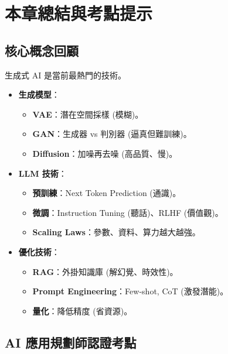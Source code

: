 \documentclass[
  letterpaper,
  DIV=11,
  numbers=noendperiod]{scrreprt}
\providecommand{\tightlist}{%
  \setlength{\itemsep}{0pt}\setlength{\parskip}{0pt}}
\begin{document}
\chapter{本章總結與考點提示}\label{sec-chapter8-summary}

\section{核心概念回顧}\label{ux6838ux5fc3ux6982ux5ff5ux56deux9867-7}

生成式 AI 是當前最熱門的技術。

\begin{itemize}
\tightlist
\item
  \textbf{生成模型}：

  \begin{itemize}
  \tightlist
  \item
    \textbf{VAE}：潛在空間採樣 (模糊)。
  \item
    \textbf{GAN}：生成器 vs 判別器 (逼真但難訓練)。
  \item
    \textbf{Diffusion}：加噪再去噪 (高品質、慢)。
  \end{itemize}
\item
  \textbf{LLM 技術}：

  \begin{itemize}
  \tightlist
  \item
    \textbf{預訓練}：Next Token Prediction (通識)。
  \item
    \textbf{微調}：Instruction Tuning (聽話)、RLHF (價值觀)。
  \item
    \textbf{Scaling Laws}：參數、資料、算力越大越強。
  \end{itemize}
\item
  \textbf{優化技術}：

  \begin{itemize}
  \tightlist
  \item
    \textbf{RAG}：外掛知識庫 (解幻覺、時效性)。
  \item
    \textbf{Prompt Engineering}：Few-shot, CoT (激發潛能)。
  \item
    \textbf{量化}：降低精度 (省資源)。
  \end{itemize}
\end{itemize}

\section{AI
應用規劃師認證考點}\label{ai-ux61c9ux7528ux898fux5283ux5e2bux8a8dux8b49ux8003ux9ede-7}
\end{document}
